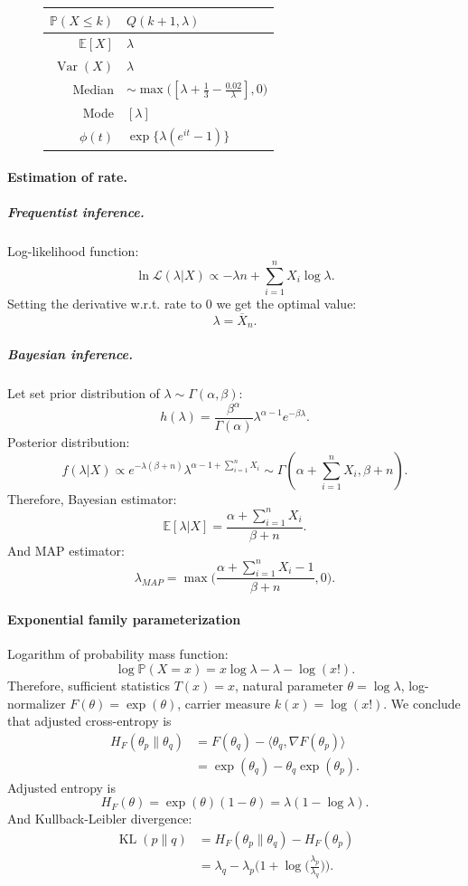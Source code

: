 \documentclass[a4paper,11pt]{article}
\theoremstyle{plain}
\theoremstyle{definition}
\newcommand{\ME}{\mathbb{E}}
\newcommand{\MP}{\mathbb{P}}
\newcommand{\Var}{\operatorname{Var}}
\begin{document}
\begin{figure}[!htb]
\begin{minipage}{0.4\textwidth}
\begin{tabular}{| r | l |}
					\hline
					$\MP(X \leq k)$ & $Q(k+1, \lambda)$ \\
					\hline
					$\ME[X]$ & $ \lambda$ \\
					\hline
					$\Var(X)$ & $\lambda$ \\
					\hline
					Median & $\sim \max\big([\lambda + \frac{1}{3} - \frac{0.02}{\lambda}], 0\big) $ \\
					\hline
					Mode & $[\lambda]$ \\
					\hline
					$\phi(t)$ & $ \exp \{ \lambda(e^{it}-1) \}  $ \\
					\hline
				\end{tabular}
			\end{minipage}
		\end{figure}
	
	\paragraph{Estimation of rate.}
	\subparagraph{Frequentist inference.}
	Log-likelihood function:
	\[ \ln \mathcal{L}(\lambda | X) \propto -\lambda n + \sum_{i=1}^{n}X_i \log \lambda. \]
	Setting the derivative w.r.t. rate to $0$ we get the optimal value:
	\[ \lambda = \overline{X}_n. \]
	\subparagraph{Bayesian inference.}
	Let set prior distribution of $\lambda \sim \Gamma(\alpha, \beta)$:
	\[
	h(\lambda) = \frac{\beta^\alpha}{\Gamma(\alpha)} \lambda^{\alpha-1}e^{-\beta \lambda}.
	\]
	Posterior distribution:
	\[
	f(\lambda|X) \propto e^{-\lambda (\beta + n)}  \lambda^{\alpha - 1 + \sum_{i=1}^{n}X_i} \sim \Gamma(\alpha + \sum_{i=1}^{n}X_i, \beta + n).
	\]
	Therefore, Bayesian estimator:
	\[
	\mathbb{E}[\lambda|X] = \frac{\alpha + \sum_{i=1}^{n}X_i}{\beta + n}.
	\]
	And MAP estimator:
	\[
	\lambda_{MAP} = \max \bigg( \frac{\alpha + \sum_{i=1}^{n}X_i - 1}{\beta + n}, 0 \bigg).
	\]
	
	\paragraph{Exponential family parameterization}
	Logarithm of probability mass function:
	\[
	\log \MP(X = x) = x \log \lambda - \lambda - \log(x!).
	\]
	Therefore, sufficient statistics $T(x) = x$, natural parameter $\theta = \log \lambda$, log-normalizer $F(\theta) = \exp(\theta)$, carrier measure $k(x) = \log(x!)$. We conclude that adjusted cross-entropy is
	\[
	\begin{aligned}
	H_F(\theta_p \| \theta_q) &= F(\theta_q) - \langle \theta_q, \nabla F(\theta_p) \rangle \\
	&= \exp(\theta_q) - \theta_q \exp(\theta_p).
	\end{aligned}
	\]
	Adjusted entropy is
	\[
	H_F(\theta) = \exp(\theta) (1 - \theta) = \lambda (1 - \log \lambda).
	\]
	And Kullback-Leibler divergence:
	\[
	\begin{aligned}
	\operatorname{KL}(p \| q) &= H_F(\theta_p \| \theta_q) - H_F(\theta_p) \\
	&= \lambda_q -  \lambda_p \bigg(1 + \log \bigg(\frac{\lambda_p}{\lambda_q}\bigg)\bigg).
	\end{aligned}
	\]
	
\end{document}
